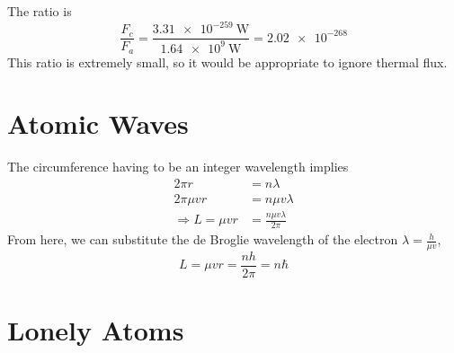 \documentclass{article}
\begin{document}
The ratio is
\begin{equation}
    \frac{F_c}{F_a} = \frac{\SI{3.31e-259}{\watt}}{\SI{1.64e+9}{\watt}} = \num{2.02e-268}
\end{equation}
This ratio is extremely small, so it would be appropriate to ignore thermal flux.

\section{Atomic Waves}

The circumference having to be an integer wavelength implies
\begin{align}
    2 \pi r &= n \lambda \\
    2 \pi \mu v r &= n \mu v \lambda \\
    \Rightarrow L = \mu v r &= \frac{n \mu v \lambda}{2 \pi}
\end{align}
From here, we can substitute the de Broglie wavelength of the electron \(\lambda = \frac{h}{\mu v}\),
\begin{equation}
    L = \mu v r = \frac{n h}{2 \pi} = n \hbar
\end{equation}

\section{Lonely Atoms}

\subsection{}
\end{document}
